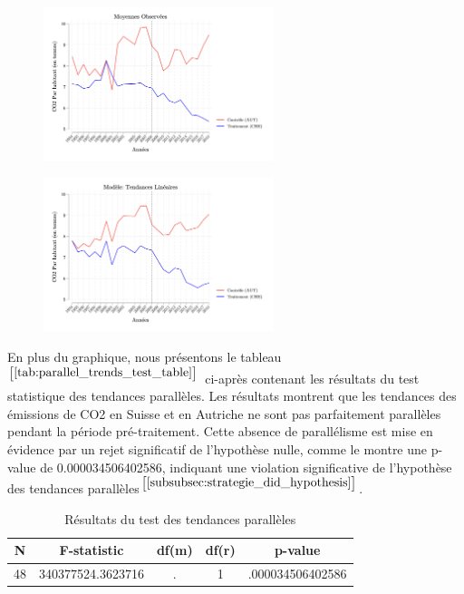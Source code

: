 \begin{figure}[H]
\centering
\includegraphics[width=0.6\textwidth]{Article/images/pt_test_omeans.png}
\caption{}
\label{fig:omeans}
    \end{figure}

\vspace*{0.5cm}

\begin{figure}[H]
\centering
\includegraphics[width=0.6\textwidth]{Article/images/linear_trend_test.png}
\caption{}
\label{fig:pt_test}
    \end{figure}

    
En plus du graphique, nous présentons le  tableau$^{\left[\ref{tab:parallel_trends_test_table}\right]}$ ci-après contenant les résultats du test statistique des tendances parallèles. Les résultats montrent que les tendances des émissions de CO2 en Suisse et en Autriche ne sont pas parfaitement parallèles pendant la période pré-traitement. Cette absence de parallélisme est mise en évidence par un rejet significatif de l'hypothèse nulle, comme le montre une p-value de 0.000034506402586, indiquant une violation significative de l'hypothèse des tendances parallèles$^{\left[\ref{subsubsec:strategie_did_hypothesis}\right]}$.


\begin{table}[H]
\centering
\footnotesize{
\begin{tabular}{|c|c|c|c|c|} 
\hline
N & F-statistic & df(m) & df(r) & p-value \\ \hline
48 & 340377524.3623716 & . & 1 & .000034506402586 \\ \hline
\end{tabular}
}
\caption{Résultats du test des tendances parallèles}
\label{tab:parallel_trends_test_table}
\end{table}

